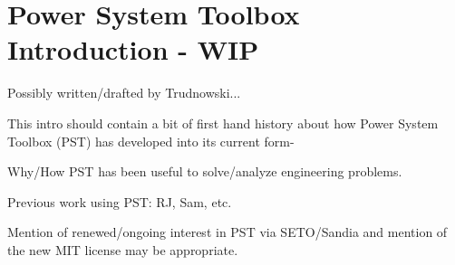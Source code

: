 \vspace{2em} %
\chapter*{Power System Toolbox Introduction  - WIP}


Possibly written/drafted by Trudnowski...
\vspace{1em}

This intro should contain a bit of first hand history about how Power System Toolbox (PST) has developed into its current form- 

Why/How PST has been useful to solve/analyze engineering problems.

Previous work using PST: RJ, Sam, etc.

Mention of renewed/ongoing interest in PST via SETO/Sandia and mention of the new MIT license may be appropriate.
